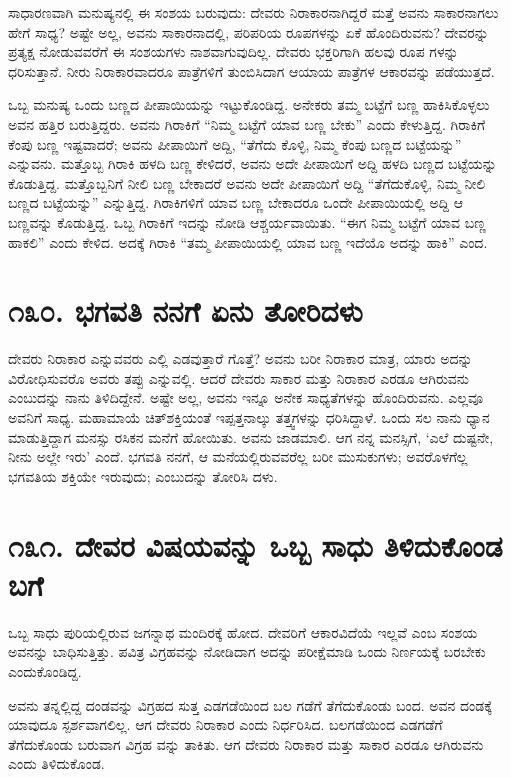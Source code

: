 ಸಾಧಾರಣವಾಗಿ ಮನುಷ್ಯನಲ್ಲಿ ಈ ಸಂಶಯ ಬರುವುದು: ದೇವರು ನಿರಾಕಾರನಾಗಿದ್ದರೆ ಮತ್ತೆ ಅವನು ಸಾಕಾರನಾಗಲು ಹೇಗೆ ಸಾಧ್ಯ? ಅಷ್ಟೇ ಅಲ್ಲ, ಅವನು ಸಾಕಾರನಾದಲ್ಲಿ, ಪರಿಪರಿಯ ರೂಪಗಳನ್ನು ಏಕೆ ಹೊಂದಿರುವನು? ದೇವರನ್ನು ಪ್ರತ್ಯಕ್ಷ ನೋಡುವವರೆಗೆ ಈ ಸಂಶಯಗಳು ನಾಶವಾಗುವುದಿಲ್ಲ. ದೇವರು ಭಕ್ತರಿಗಾಗಿ ಹಲವು ರೂಪ ಗಳನ್ನು ಧರಿಸುತ್ತಾನೆ. ನೀರು ನಿರಾಕಾರವಾದರೂ ಪಾತ್ರೆಗಳಿಗೆ ತುಂಬಿಸಿದಾಗ ಆಯಾಯ ಪಾತ್ರೆಗಳ ಆಕಾರವನ್ನು ಪಡೆಯುತ್ತದೆ.

ಒಬ್ಬ ಮನುಷ್ಯ ಒಂದು ಬಣ್ಣದ ಪೀಪಾಯಿಯನ್ನು ಇಟ್ಟುಕೊಂಡಿದ್ದ. ಅನೇಕರು ತಮ್ಮ ಬಟ್ಟೆಗೆ ಬಣ್ಣ ಹಾಕಿಸಿಕೊಳ್ಳಲು ಅವನ ಹತ್ತಿರ ಬರುತ್ತಿದ್ದರು. ಅವನು ಗಿರಾಕಿಗೆ “ನಿಮ್ಮ ಬಟ್ಟೆಗೆ ಯಾವ ಬಣ್ಣ ಬೇಕು” ಎಂದು ಕೇಳುತ್ತಿದ್ದ. ಗಿರಾಕಿಗೆ ಕೆಂಪು ಬಣ್ಣ ಇಷ್ಟವಾದರೆ; ಅವನು ಪೀಪಾಯಿಗೆ ಅದ್ದಿ, “ತೆಗೆದು ಕೊಳ್ಳಿ, ನಿಮ್ಮ ಕೆಂಪು ಬಣ್ಣದ ಬಟ್ಟೆಯನ್ನು” ಎನ್ನುವನು. ಮತ್ತೊಬ್ಬ ಗಿರಾಕಿ ಹಳದಿ ಬಣ್ಣ ಕೇಳಿದರೆ, ಅವನು ಅದೇ ಪೀಪಾಯಿಗೆ ಅದ್ದಿ ಹಳದಿ ಬಣ್ಣದ ಬಟ್ಟೆಯನ್ನು ಕೊಡುತ್ತಿದ್ದ. ಮತ್ತೊಬ್ಬನಿಗೆ ನೀಲಿ ಬಣ್ಣ ಬೇಕಾದರೆ ಅವನು ಅದೇ ಪೀಪಾಯಿಗೆ ಅದ್ದಿ “ತೆಗೆದುಕೊಳ್ಳಿ, ನಿಮ್ಮ ನೀಲಿ ಬಣ್ಣದ ಬಟ್ಟೆಯನ್ನು” ಎನ್ನುತ್ತಿದ್ದ. ಗಿರಾಕಿಗಳಿಗೆ ಯಾವ ಬಣ್ಣ ಬೇಕಾದರೂ ಒಂದೇ ಪೀಪಾಯಿಯಲ್ಲಿ ಅದ್ದಿ ಆ ಬಣ್ಣವನ್ನು ಕೊಡುತ್ತಿದ್ದ. ಒಬ್ಬ ಗಿರಾಕಿಗೆ ಇದನ್ನು ನೋಡಿ ಆಶ್ಚರ್ಯವಾಯಿತು. “ಈಗ ನಿಮ್ಮ ಬಟ್ಟೆಗೆ ಯಾವ ಬಣ್ಣ ಹಾಕಲಿ” ಎಂದು ಕೇಳಿದ. ಅದಕ್ಕೆ ಗಿರಾಕಿ “ತಮ್ಮ ಪೀಪಾಯಿಯಲ್ಲಿ ಯಾವ ಬಣ್ಣ ಇದೆಯೊ ಅದನ್ನು ಹಾಕಿ” ಎಂದ.


\section{\num{೧೩೦. } ಭಗವತಿ ನನಗೆ ಏನು ತೋರಿದಳು}

ದೇವರು ನಿರಾಕಾರ ಎನ್ನುವವರು ಎಲ್ಲಿ ಎಡವುತ್ತಾರೆ ಗೊತ್ತೆ? ಅವನು ಬರೀ ನಿರಾಕಾರ ಮಾತ್ರ, ಯಾರು ಅದನ್ನು ವಿರೋಧಿಸುವರೊ ಅವರು ತಪ್ಪು ಎನ್ನುವಲ್ಲಿ. ಆದರೆ ದೇವರು ಸಾಕಾರ ಮತ್ತು ನಿರಾಕಾರ ಎರಡೂ ಆಗಿರುವನು ಎಂಬುದನ್ನು ನಾನು ತಿಳಿದಿದ್ದೇನೆ. ಅಷ್ಟೇ ಅಲ್ಲ, ಅವನು ಇನ್ನೂ ಅನೇಕ ಸಾಧ್ಯತೆಗಳನ್ನು ಹೊಂದಿರುವನು. ಎಲ್ಲವೂ ಅವನಿಗೆ ಸಾಧ್ಯ. ಮಹಾಮಾಯೆ ಚಿತ್​ಶಕ್ತಿಯಂತೆ ಇಪ್ಪತ್ತನಾಲ್ಕು ತತ್ತ್ವಗಳನ್ನು ಧರಿಸಿದ್ದಾಳೆ. ಒಂದು ಸಲ ನಾನು ಧ್ಯಾನ ಮಾಡುತ್ತಿದ್ದಾಗ ಮನಸ್ಸು ರಸಿಕನ ಮನೆಗೆ ಹೋಯಿತು. ಅವನು ಜಾಡಮಾಲಿ. ಆಗ ನನ್ನ ಮನಸ್ಸಿಗೆ, ‘ಎಲೆ ದುಷ್ಟನೇ, ನೀನು ಅಲ್ಲೇ ಇರು’ ಎಂದೆ. ಭಗವತಿ ನನಗೆ, ಆ ಮನೆಯಲ್ಲಿರುವವರೆಲ್ಲ ಬರೀ ಮುಸುಕುಗಳು; ಅವರೊಳಗೆಲ್ಲ ಭಗವತಿಯ ಶಕ್ತಿಯೇ ಇರುವುದು; ಎಂಬುದನ್ನು ತೋರಿಸಿ ದಳು.


\section{\num{೧೩೧. } ದೇವರ ವಿಷಯವನ್ನು ಒಬ್ಬ ಸಾಧು ತಿಳಿದುಕೊಂಡ ಬಗೆ}

ಒಬ್ಬ ಸಾಧು ಪುರಿಯಲ್ಲಿರುವ ಜಗನ್ನಾಥ ಮಂದಿರಕ್ಕೆ ಹೋದ. ದೇವರಿಗೆ ಆಕಾರವಿದೆಯೆ ಇಲ್ಲವೆ ಎಂಬ ಸಂಶಯ ಅವನನ್ನು ಬಾಧಿಸುತ್ತಿತ್ತು. ಪವಿತ್ರ ವಿಗ್ರಹವನ್ನು ನೋಡಿದಾಗ ಅದನ್ನು ಪರೀಕ್ಷೆಮಾಡಿ ಒಂದು ನಿರ್ಣಯಕ್ಕೆ ಬರಬೇಕು ಎಂದುಕೊಂಡಿದ್ದ.

ಅವನು ತನ್ನಲ್ಲಿದ್ದ ದಂಡವನ್ನು ವಿಗ್ರಹದ ಸುತ್ತ ಎಡಗಡೆಯಿಂದ ಬಲ ಗಡೆಗೆ ತೆಗೆದುಕೊಂಡು ಬಂದ. ಅವನ ದಂಡಕ್ಕೆ ಯಾವುದೂ ಸ್ಪರ್ಶವಾಗಲಿಲ್ಲ. ಆಗ ದೇವರು ನಿರಾಕಾರ ಎಂದು ನಿರ್ಧರಿಸಿದ. ಬಲಗಡೆಯಿಂದ ಎಡಗಡೆಗೆ ತೆಗೆದುಕೊಂಡು ಬರುವಾಗ ವಿಗ್ರಹ ವನ್ನು ತಾಕಿತು. ಆಗ ದೇವರು ನಿರಾಕಾರ ಮತ್ತು ಸಾಕಾರ ಎರಡೂ ಆಗಿರುವನು ಎಂದು ತಿಳಿದುಕೊಂಡ.


